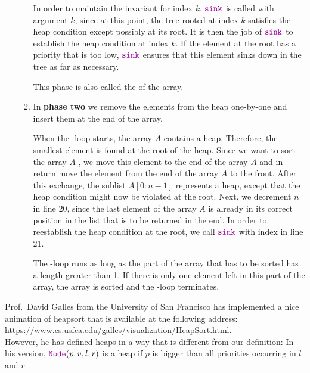 \begin{enumerate}
\begin{enumerate}
            In order to maintain the invariant for index ${k}$, $\mytt{sink}$ is called with
            argument ${k}$,  since at this point, the tree rooted at index ${k}$ satisfies
            the heap condition except possibly at its root.  It is then the job of $\mytt{sink}$ to
            establish the heap condition at index ${k}$.  If the element at the root has a
            priority that is too low, $\mytt{sink}$ ensures that this element sinks down in the tree
            as far as necessary.

            This phase is also called the   of the array.
      \item In \textbf{phase two} we remove the elements from the heap one-by-one and insert them at the end of
            the array.

            When the -loop starts, the array ${A}$ contains a heap.  Therefore,
            the smallest element is found at the root of the heap.  Since we want to sort the
            array ${A}$ , we move this element to the end of the array ${A}$ and in
            return move the element from the end of the array ${A}$ to the front.
            After this exchange, the sublist $A[0:n-1]$ represents a heap, except that the
            heap condition might now be violated at the root.  Next, we decrement ${n}$ in line 20, since the
            last element of the array ${A}$ is already in its correct position in the list that is to be
            returned in the end.  In order to reestablish the heap condition at the root, we call $\mytt{sink}$ with index
             in line 21.

            The -loop runs as long as the part of the array that has to be sorted has
            a length greater than 1.  If there is only one element left in this part of the array, the array is
            sorted and the -loop terminates.
      \end{enumerate}
\end{enumerate}
Prof.~David Galles from the University of San Francisco has implemented a nice animation of heapsort that is
available at the following address:
\\[0.2cm]
\hspace*{1.3cm}
\href{https://www.cs.usfca.edu/~galles/visualization/HeapSort.html}{https://www.cs.usfca.edu/galles/visualization/HeapSort.html}.
\\[0.2cm] 
However, he has defined heaps in a way that is different from our definition:  In his version,
$\mytt{Node}(p, v, l, r)$ is a heap if $p$ is bigger than all priorities occurring in $l$ and $r$.

